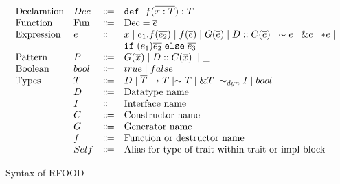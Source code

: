 \documentclass[ oneside,%
                    author={James Elgar},
                    degree={MEng},
                     title={Bidirectional transformer between functional and \\ object-oriented programming in Rust},
                  subtitle={}]{dissertation}
\begin{document}
\begin{figure}[t]
\begin{displaymath}
\begin{array}{l}
\begin{array}{llcl}
         \text{Declaration}
         & Dec & \Coloneqq & \dec {x: T} T\\
         \text{Function}
         & \text{Fun} & \text{$\Coloneqq$} & \text{Dec} = \overline{e} \\
        \text{Expression}
         & e & \Coloneqq & x %
          \mid e_1.f(\overline{e_2})  \mid f(\overline{e}) \mid \genn(\overline{e}) \mid \ctrCall{\dtn}{\ctrn}{e} \mid \sim e\mid \&e \mid *e \mid\\
         &   &           & \ifelseexpr{e_1}{e_2}{e_3} \\
         \text{Pattern}
         & P & \Coloneqq & \genn(\overline{x}) \mid \ctrCall{\dtn}{\ctrn}{x} \mid \_ \\
        \text{Boolean}
        & bool & \Coloneqq & true \mid false  \\
        \text{Types}
        & T & \Coloneqq & \dtn \mid \overline{T} \rightarrow T \mid \sim  T \mid \& T \mid \sim_{dyn} \itn \mid bool \\ %
        & \dtn & \Coloneqq & \text{Datatype name} \\
        & \itn & \Coloneqq & \text{Interface name} \\
        & \ctrn & \Coloneqq & \text{Constructor name} \\
        & \genn & \Coloneqq & \text{Generator name} \\
        & f & \Coloneqq & \text{Function or destructor name} \\
        & Self & \Coloneqq & \text{Alias for type of trait within trait or impl block} \\
        
      \end{array}
    \end{array}
  \end{displaymath}
  \caption{Syntax of RFOOD}
  \label{fig:syntax}
\end{figure}
\end{document}
